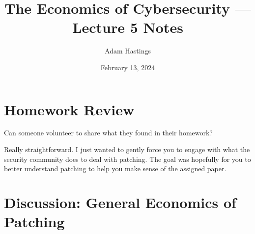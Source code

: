 \documentclass[11pt]{article}
\title{The Economics of Cybersecurity --- Lecture 5 Notes}
\date{February 13, 2024}
\author{Adam Hastings}
\begin{document}
\maketitle


\section*{Homework Review}

Can someone volunteer to share what they found in their homework?

Really straightforward. I just wanted to gently force you to engage with what the security community does to deal with patching. The goal was hopefully for you to better understand patching to help you make sense of the assigned paper. 

\section*{Discussion: General Economics of Patching}
\end{document}
